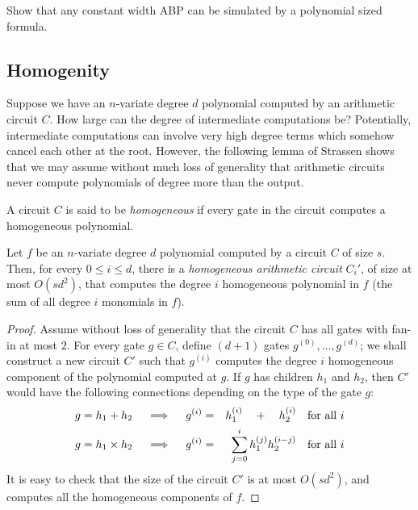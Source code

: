 \begin{exercise}
Show that any constant width ABP can be simulated by a polynomial sized formula. 
\end{exercise}

\subsection{Homogenity}\label{sec:homogenization}

Suppose we have an $n$-variate degree $d$ polynomial computed by an arithmetic circuit $C$. 
How large can the degree of intermediate computations be? 
Potentially, intermediate computations can involve very high degree terms which somehow cancel each other at the root. 
However, the following lemma of Strassen shows that we may assume without much loss of generality that arithmetic circuits never compute polynomials of degree more than the output. 

\begin{definition}
A circuit $C$ is said to be \emph{homogeneous} if every gate in the circuit computes a homogeneous polynomial. 
\end{definition}

\begin{lemma}[Homogenization]\label{lem:homogenization}
    Let $f$ be an $n$-variate degree $d$ polynomial computed by a circuit $C$ of size $s$. 
    Then, for every $0\leq i \leq d$, there is a \emph{homogeneous arithmetic circuit} $C_i'$, of size at most $O(sd^2)$, that computes the degree $i$ homogeneous polynomial in $f$ (the sum of all degree $i$ monomials in $f$).  
\end{lemma}
\begin{proof}
    Assume without loss of generality that the circuit $C$ has all gates with fan-in at most $2$. 
    For every gate $g\in C$, define $(d+1)$ gates $g^{(0)},\dots, g^{(d)}$; we shall construct a new circuit $C'$ such that $g^{(i)}$ computes the degree $i$ homogeneous component of the polynomial computed at $g$. 
    If $g$ has children $h_1$ and $h_2$, then $C'$ would have the following connections depending on the type of the gate $g$:
    \begin{eqnarray*}
        \text{$g = h_1 + h_2$}\quad\implies\quad g^{(i)} &=& h_1^{(i)} \quad + \quad h_2^{(i)}\quad\text{for all $i$}\\
        \text{$g = h_1 \times h_2$}\quad\implies\quad g^{(i)} &=& \sum_{j=0}^i h_1^{(j)} h_2^{(i-j)}\quad\text{for all $i$}
    \end{eqnarray*}
    It is easy to check that the size of the circuit $C'$ is at most $O(sd^2)$, and computes all the homogeneous components of $f$. 
\end{proof}

